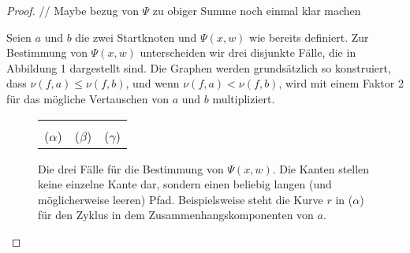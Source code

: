\documentclass[a4paper, 10pt, ngerman]{article}
\begin{document}
\begin{proof}
    // Maybe bezug von $\Psi$ zu obiger Summe noch einmal klar machen


    Seien $a$ und $b$ die zwei Startknoten und $\Psi(x, w)$ wie bereits definiert. Zur Bestimmung von $\Psi(x, w)$ unterscheiden wir drei disjunkte Fälle, die in Abbildung 1 dargestellt sind. Die Graphen werden grundsätzlich so konstruiert, dass $\nu(f, a) \le \nu(f, b)$, und wenn $\nu(f, a) < \nu(f, b)$, wird mit einem Faktor 2 für das mögliche Vertauschen von $a$ und $b$ multipliziert.
    \\

    \begin{figure}
        \begin{tabular}{ccc}
             &  &  \\
            ($\alpha$)                           & ($\beta$)                           & ($\gamma$)
        \end{tabular}
        \caption{Die drei Fälle für die Bestimmung von $\Psi(x, w)$. Die Kanten stellen keine einzelne Kante dar, sondern einen beliebig langen (und möglicherweise leeren) Pfad. Beispielsweise steht die Kurve $r$ in ($\alpha$) für den Zyklus in dem Zusammenhangskomponenten von $a$.}
    \end{figure}


\end{proof}
\end{document}
